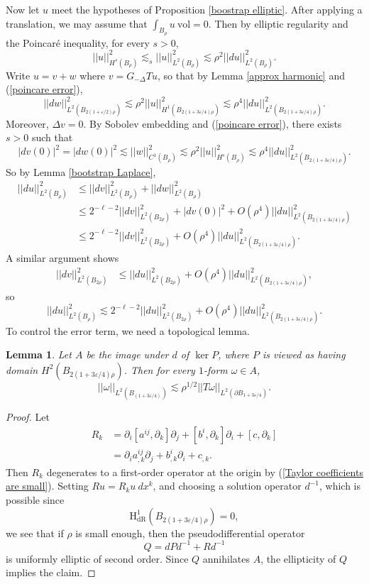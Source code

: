 \documentclass[reqno,12pt,letterpaper]{amsart}
\newcommand{\Homology}{\mathrm H_{\mathrm{dR}}}
\newcommand{\vol}{\mathrm{vol}}
\newtheorem{lemma}[theorem]{Lemma}
\theoremstyle{definition}
\numberwithin{equation}{section}
\begin{document}
Now let $u$ meet the hypotheses of Proposition \ref{boostrap elliptic}.
After applying a translation, we may assume that $\int_{B_\rho} u~\vol = 0$.
Then by elliptic regularity and the Poincar\'e inequality, for every $s > 0$,
\begin{equation}\label{poincare error}
||u||_{H^s(B_\rho)}^2 \lesssim_s ||u||_{L^2(B_\rho)}^2 \lesssim \rho^2 ||du||_{L^2(B_\rho)}^2.
\end{equation}
Write $u = v + w$ where $v = G_{-\Delta}Tu$, so that by Lemma \ref{approx harmonic} and (\ref{poincare error}),
$$||dw||_{L^2(B_{2(1 + \varepsilon/2)\rho})}^2 \lesssim \rho^2 ||u||_{H^1(B_{2(1 + 3\varepsilon/4)\rho})}^2 \lesssim \rho^4 ||du||_{L^2(B_{2(1 + 3\varepsilon/4)\rho})}^2.$$
Moreover, $\Delta v = 0$.
By Sobolev embedding and (\ref{poincare error}), there exists $s > 0$ such that
$$|dv(0)|^2 = |dw(0)|^2 \lesssim ||w||_{C^1(B_\rho)}^2 \lesssim \rho^2||u||_{H^s(B_\rho)}^2 \lesssim \rho^4||du||_{L^2(B_{2(1 + 3\varepsilon/4)\rho})}^2.$$
So by Lemma \ref{bootstrap Laplace},
\begin{align*}
||du||_{L^2(B_\rho)}^2 &\leq ||dv||_{L^2(B_\rho)}^2 + ||dw||_{L^2(B_\rho)}^2 \\
&\leq 2^{-\ell-2} ||dv||_{L^2(B_{2\rho})}^2 + |dv(0)|^2 + O(\rho^4) ||du||_{L^2(B_{2(1 + 3\varepsilon/4)\rho})}^2\\
&\leq 2^{-\ell-2} ||dv||_{L^2(B_{2\rho})}^2 + O(\rho^4) ||du||_{L^2(B_{2(1 + 3\varepsilon/4)\rho})}^2.
\end{align*}
A similar argument shows
\begin{align*}
||dv||_{L^2(B_{2\rho})}^2 &\leq ||du||_{L^2(B_{2\rho})}^2 + O(\rho^4) ||du||_{L^2(B_{2(1 + 3\varepsilon/4)\rho})}^2,
\end{align*}
so
$$||du||_{L^2(B_\rho)}^2 \lesssim 2^{-\ell-2}||du||_{L^2(B_{2\rho})}^2 + O(\rho^4) ||du||_{L^2(B_{2(1 + 3\varepsilon/4)\rho})}^2.$$
To control the error term, we need a topological lemma.

\begin{lemma}\label{Poincare lemma}
Let $A$ be the image under $d$ of $\ker P$, where $P$ is viewed as having domain $H^2(B_{2(1 + 3\varepsilon/4)\rho})$.
Then for every $1$-form $\omega \in A$,
$$||\omega||_{L^2(B_{(1 + 3\varepsilon/4)})} \lesssim \rho^{1/2} ||T\omega||_{L^2(\partial B_{1 + 3\varepsilon/4})}.$$
\end{lemma}
\begin{proof}
Let
\begin{align*}
R_k &= \partial_i [a^{ij}, \partial_k] \partial_j + [b^i, \partial_k] \partial_i + [c, \partial_k]\\
&= \partial_i a^{ij}_{,k} \partial_j + b^i_{,k} \partial_i + c_{,k}.
\end{align*}
Then $R_k$ degenerates to a first-order operator at the origin by (\ref{Taylor coefficients are small}).
Setting $Ru = R_ku ~dx^k$, and choosing a solution operator $d^{-1}$, which is possible since
$$\Homology^1(B_{2(1 + 3\varepsilon/4)\rho}) = 0,$$
we see that if $\rho$ is small enough, then the pseudodifferential operator
$$Q = dPd^{-1} + Rd^{-1}$$
is uniformly elliptic of second order.
Since $Q$ annihilates $A$, the ellipticity of $Q$ implies the claim.
\end{proof}
\end{document}
